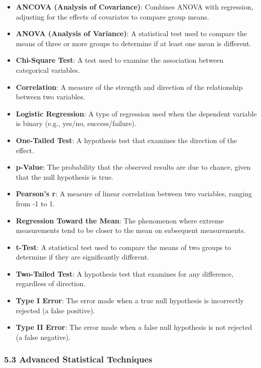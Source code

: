 \documentclass[
]{book}
\providecommand{\tightlist}{%
  \setlength{\itemsep}{0pt}\setlength{\parskip}{0pt}}
\begin{document}
\begin{itemize}
\tightlist
\item
  \textbf{ANCOVA (Analysis of Covariance)}: Combines ANOVA with regression, adjusting for the effects of covariates to compare group means.
\item
  \textbf{ANOVA (Analysis of Variance)}: A statistical test used to compare the means of three or more groups to determine if at least one mean is different.
\item
  \textbf{Chi-Square Test}: A test used to examine the association between categorical variables.
\item
  \textbf{Correlation}: A measure of the strength and direction of the relationship between two variables.
\item
  \textbf{Logistic Regression}: A type of regression used when the dependent variable is binary (e.g., yes/no, success/failure).
\item
  \textbf{One-Tailed Test}: A hypothesis test that examines the direction of the effect.
\item
  \textbf{p-Value}: The probability that the observed results are due to chance, given that the null hypothesis is true.
\item
  \textbf{Pearson's r}: A measure of linear correlation between two variables, ranging from -1 to 1.
\item
  \textbf{Regression Toward the Mean}: The phenomenon where extreme measurements tend to be closer to the mean on subsequent measurements.
\item
  \textbf{t-Test}: A statistical test used to compare the means of two groups to determine if they are significantly different.
\item
  \textbf{Two-Tailed Test}: A hypothesis test that examines for any difference, regardless of direction.
\item
  \textbf{Type I Error}: The error made when a true null hypothesis is incorrectly rejected (a false positive).
\item
  \textbf{Type II Error}: The error made when a false null hypothesis is not rejected (a false negative).
\end{itemize}

\subsubsection*{\texorpdfstring{\textbf{5.3 Advanced Statistical Techniques}}{5.3 Advanced Statistical Techniques}}\label{advanced-statistical-techniques-1}
\end{document}
